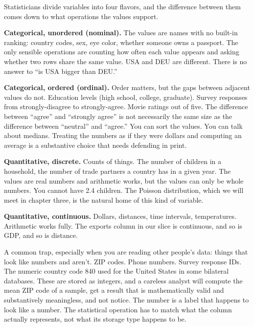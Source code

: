\documentclass[
  letterpaper,
  11pt,
  twoside,
  openany]{scrbook}
\newcounter{none} %
\begin{document}
Statisticians divide variables into four flavors, and the difference
between them comes down to what operations the values support.

\textbf{Categorical, unordered (nominal).} The values are names with no
built-in ranking: country codes, sex, eye color, whether someone owns a
passport. The only sensible operations are counting how often each value
appears and asking whether two rows share the same value. USA and DEU
are different. There is no answer to ``is USA bigger than DEU.''

\textbf{Categorical, ordered (ordinal).} Order matters, but the gaps
between adjacent values do not. Education levels (high school, college,
graduate). Survey responses from strongly-disagree to strongly-agree.
Movie ratings out of five. The difference between ``agree'' and
``strongly agree'' is not necessarily the same size as the difference
between ``neutral'' and ``agree.'' You can sort the values. You can talk
about medians. Treating the numbers as if they were dollars and
computing an average is a substantive choice that needs defending in
print.


\textbf{Quantitative, discrete.} Counts of things. The number of
children in a household, the number of trade partners a country has in a
given year. The values are real numbers and arithmetic works, but the
values can only be whole numbers. You cannot have 2.4 children. The
Poisson distribution, which we will meet in chapter three, is the
natural home of this kind of variable.

\textbf{Quantitative, continuous.} Dollars, distances, time intervals,
temperatures. Arithmetic works fully. The exports column in our slice is
continuous, and so is GDP, and so is distance.

A common trap, especially when you are reading other people's data:
things that look like numbers and aren't. ZIP codes. Phone numbers.
Survey response IDs. The numeric country code 840 used for the United
States in some bilateral databases. These are stored as integers, and a
careless analyst will compute the mean ZIP code of a sample, get a
result that is mathematically valid and substantively meaningless, and
not notice. The number is a label that happens to look like a number.
The statistical operation has to match what the column actually
represents, not what its storage type happens to be.
\end{document}
